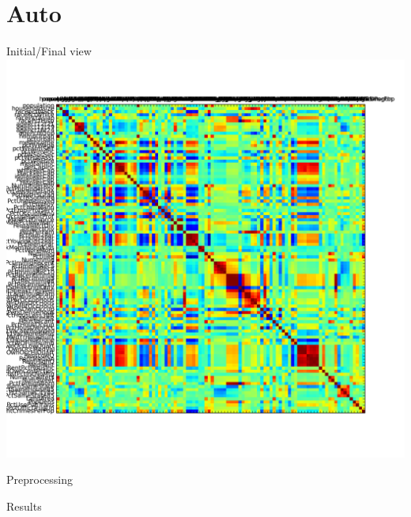 \documentclass[12pt]{beamer}
\begin{document}
\section{Auto}
\begin{frame}{Initial/Final view}
\includegraphics[height=\textheight,width=\textwidth,keepaspectratio]{plots/communities_orig.png}
\end{frame}

\begin{frame}{Preprocessing}

\end{frame}

\begin{frame}{Results}

\end{frame}
\end{document}
